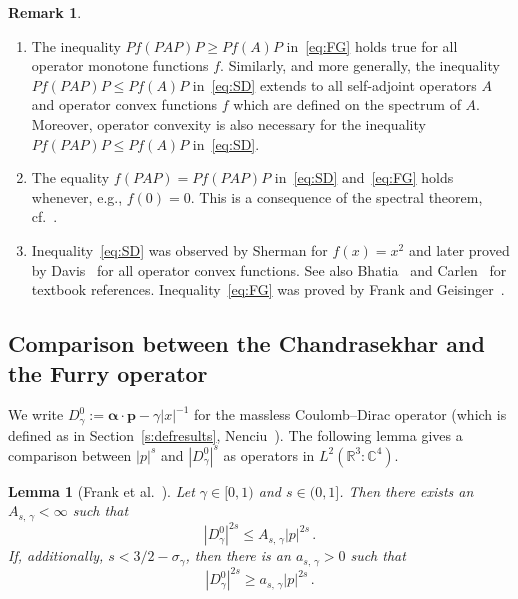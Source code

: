 \documentclass[10pt]{amsart}
\newtheorem{lemm}[cdrthm]{Lemma}
\theoremstyle{definition}
\newtheorem{rema}[cdrthm]{Remark}
\newcommand*\cz{\mathbb{C}}
\newcommand*\rz{\mathbb{R}}
\newcommand*\balpha{\bm{\alpha}}
\newcommand*\bp{\bm{p}}
\begin{document}
\begin{rema}
\leavevmode
\begin{enumerate}
\item The inequality $Pf(PAP)P \geq Pf(A)P$ in~\eqref{eq:FG} holds true for all operator monotone functions $f$. Similarly, and more generally, the inequality $Pf(PAP)P\leq Pf(A)P$ in~\eqref{eq:SD} extends to all self-adjoint operators $A$ and operator convex functions $f$ which are defined on the spectrum of $A$. Moreover, operator convexity is also necessary for the inequality $Pf(PAP)P\leq Pf(A)P$ in~\eqref{eq:SD}.

\item The equality $f(PAP)=Pf(PAP)P$ in~\eqref{eq:SD} and~\eqref{eq:FG} holds whenever, e.g., $f(0)=0$. This is a consequence of the spectral theorem, cf.~\cite[p.~43]{Davis1957}.

\item Inequality~\eqref{eq:SD} was observed by Sherman for $f(x)=x^2$ and later proved by Davis~\cite{Davis1957} for all operator convex functions. See also Bhatia~\cite[Theorem~V.2.3]{Bhatia1997} and Carlen~\cite[Theorem~4.19]{Carlen2010} for textbook references. Inequality~\eqref{eq:FG} was proved by Frank and Geisinger~\cite[Lemma~6.4]{FrankGeisinger2016}.
\end{enumerate}
\end{rema}



\subsection{Comparison between the Chandrasekhar and the Furry operator}

We write $D^0_\gamma:=\balpha\cdot\bp-\gamma|x|^{-1}$ for the massless Coulomb--Dirac operator (which is defined as in Section~\ref{s:defresults}, Nenciu~\cite{Nenciu1976}). The following lemma gives a comparison between $|p|^s$ and $|D_\gamma^0|^s$ as operators in $L^2(\rz^3:\cz^4)$.


\begin{lemm}[{Frank et al.~\cite[Corollary~1.8]{Franketal2021}}]\label{hardydom}
Let $\gamma\in[0,1)$ and $s\in(0,1]$. Then there exists an $A_{s,\,\gamma}<\infty$ such that
\[
\left|D^0_\gamma\right|^{2s} \leq A_{s,\,\gamma} |p|^{2s}\,.
\]
If, additionally, $s<3/2-\sigma_{\gamma}$, then there is an $a_{s,\,\gamma}>0$ such that
\[
\left|D^0_\gamma\right|^{2s} \geq a_{s,\,\gamma} |p|^{2s}\,.
\]
\end{lemm}
\end{document}
